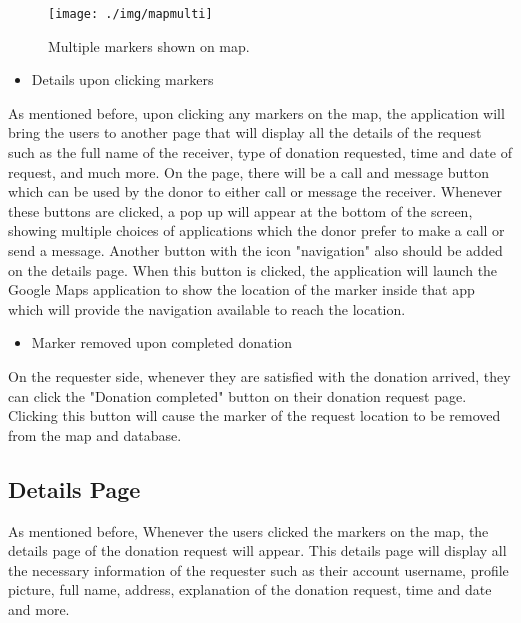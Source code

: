 \documentclass[conference]{IEEEtran}
\begin{document}
\begin{figure}[h!]
\texttt{[image: ./img/mapmulti]}
\centering
\caption{Multiple markers shown on map.}
\end{figure}
\begin{itemize}
\item Details upon clicking markers
\end{itemize}
\par As mentioned before, upon clicking any markers on the map, the application will bring the users to another page that will display all the details of the request such as the full name of the receiver, type of donation requested, time and date of request, and much more. On the page, there will be a call and message button which can be used by the donor to either call or message the receiver. Whenever these buttons are clicked, a pop up will appear at the bottom of the screen, showing multiple choices of applications which the donor prefer to make a call or send a message. Another button with the icon "navigation" also should be added on the details page. When this button is clicked, the application will launch the Google Maps application to show the location of the marker inside that app which will provide the navigation available to reach the location.\\

\begin{itemize}
\item Marker removed upon completed donation
\end{itemize}
\par On the requester side, whenever they are satisfied with the donation arrived, they can click the "Donation completed" button on their donation request page. Clicking this button will cause the marker of the request location to be removed from the map and database.\\

\subsection{Details Page}

\par As mentioned before, Whenever the users clicked the markers on the map, the details page of the donation request will appear. This details page will display all the necessary information of the requester such as their account username, profile picture, full name, address, explanation of the donation request, time and date and more.
\end{document}
